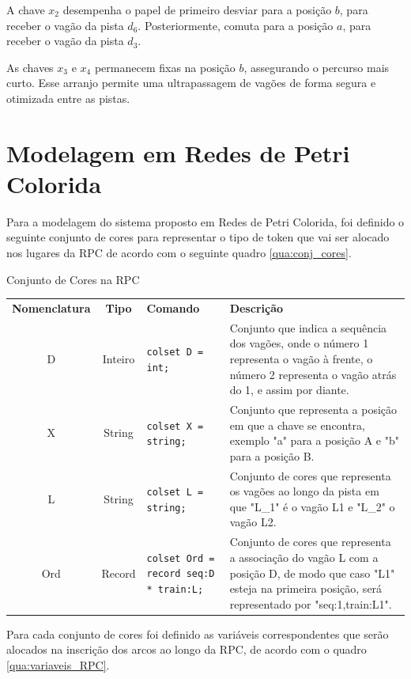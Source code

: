 A chave $x_2$ desempenha o papel de primeiro desviar para a posição $b$, para receber o vagão da pista $d_6$. Posteriormente, comuta para a posição $a$, para receber o vagão da pista $d_3$.

As chaves $x_3$ e $x_4$ permanecem fixas na posição $b$, assegurando o percurso mais curto. Esse arranjo permite uma ultrapassagem de vagões de forma segura e otimizada entre as pistas.

\section{Modelagem em Redes de Petri Colorida}
\label{sec:model_RPC}
Para a modelagem do sistema proposto em Redes de Petri Colorida, foi definido o seguinte conjunto de cores para representar o tipo de token que vai ser alocado nos lugares da RPC de acordo com o seguinte quadro \ref{qua:conj_cores}.

\begin{quadro}[h]
\centering
\caption{Conjunto de Cores na RPC}
\begin{tabularx}{\textwidth}{|c|c|X|X|}
\hline
\textbf{Nomenclatura} & \textbf{Tipo}    & \textbf{Comando}                             & \textbf{Descrição} \\
\cline{1-4}
D & Inteiro & \texttt{colset D = int;} 
& Conjunto que indica a sequência dos vagões, onde o número 1 representa o vagão à frente, o número 2 representa o vagão atrás do 1, e assim por diante. \\ 
\cline{1-4}
X & String  & \texttt{colset X = string;} 
& Conjunto que representa a posição em que a chave se encontra, exemplo "a" para a posição A e "b" para a posição B. \\
\cline{1-4}
L & String  & \texttt{colset L = string;}         
& Conjunto de cores que representa os vagões ao longo da pista em que "L\_1" é o vagão L1 e "L\_2" o vagão L2. \\
\cline{1-4}
Ord & Record  & \texttt{colset Ord = record seq:D * train:L;} 
& Conjunto de cores que representa a associação do vagão L com a posição D,
de modo que caso "L1" esteja na primeira posição, será representado por "seq:1,train:L1". \\ 
\cline{1-4}

\end{tabularx}
\label{qua:conj_cores}
\end{quadro}

 Para cada conjunto de cores foi definido as variáveis correspondentes que serão alocados na inscrição dos arcos ao longo da RPC, de acordo com o quadro \ref{qua:variaveis_RPC}.


